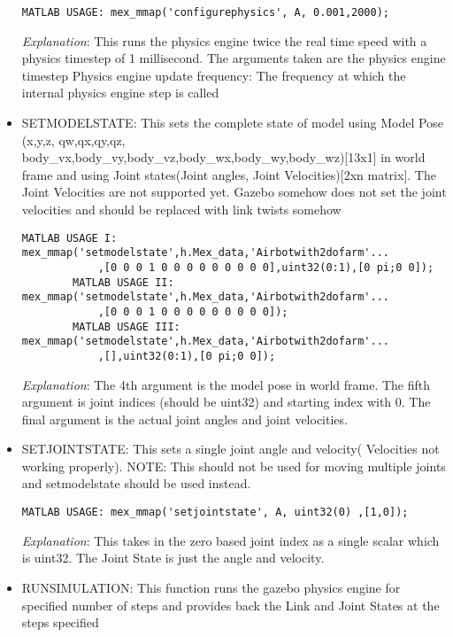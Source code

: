 \documentclass[letterpaper,10pt]{article}
\begin{document}
\begin{itemize}
\begin{Verbatim}[frame=single]
        MATLAB USAGE: mex_mmap('configurephysics', A, 0.001,2000); 

\end{Verbatim}
        \textit{Explanation}: This runs the physics engine twice the real time speed with a physics timestep of 1 millisecond. The arguments taken are the physics engine timestep 
        Physics engine update frequency: The frequency at which the internal physics engine step is called
\item
  SETMODELSTATE: This sets the complete state of model using Model Pose
  (x,y,z, qw,qx,qy,qz,
  body\_vx,body\_vy,body\_vz,body\_wx,body\_wy,body\_wz){[}13x1{]} in
  world frame and using Joint states(Joint angles, Joint
  Velocities){[}2xn matrix{]}. %
  The Joint Velocities are not supported yet. Gazebo somehow does not set the joint velocities and
  should be replaced with link twists somehow

\begin{Verbatim}[frame=single]
        MATLAB USAGE I: mex_mmap('setmodelstate',h.Mex_data,'Airbotwith2dofarm'...
			,[0 0 0 1 0 0 0 0 0 0 0 0 0],uint32(0:1),[0 pi;0 0]);
        MATLAB USAGE II: mex_mmap('setmodelstate',h.Mex_data,'Airbotwith2dofarm'...
			,[0 0 0 1 0 0 0 0 0 0 0 0 0]);
        MATLAB USAGE III: mex_mmap('setmodelstate',h.Mex_data,'Airbotwith2dofarm'...
			,[],uint32(0:1),[0 pi;0 0]);
\end{Verbatim}
        \textit{Explanation}: The 4th argument is the model pose in world frame. The fifth argument is joint indices (should be uint32) and starting index with 0. The final argument is the actual
        joint angles and joint velocities.
\item
  SETJOINTSTATE: This sets a single joint angle and velocity(%
  Velocities not working properly). NOTE: This should not be used for
  moving multiple joints and setmodelstate should be used instead.

\begin{Verbatim}[frame=single]
    MATLAB USAGE: mex_mmap('setjointstate', A, uint32(0) ,[1,0]);
\end{Verbatim}
    \textit{Explanation}: This takes in the zero based joint index as a single scalar which is uint32. The Joint State is just the angle and velocity. 
\item
  RUNSIMULATION: This function runs the gazebo physics engine for
  specified number of steps and provides back the Link and Joint States
  at the steps specified


\end{itemize}
\end{document}
